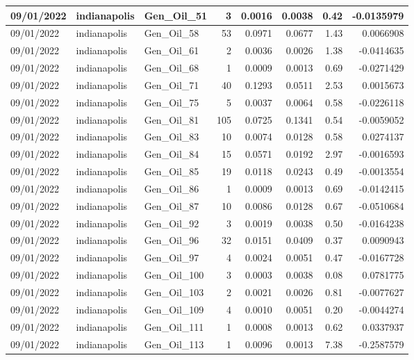 \documentclass[
  letterpaper,
  DIV=11,
  numbers=noendperiod]{scrartcl}
\begin{document}
\begin{tabular}{l|l|l|r|r|r|r|r}
\hline
09/01/2022 & indianapolis & Gen\_Oil\_51 & 3 & 0.0016 & 0.0038 & 0.42 & -0.0135979\\
\hline
09/01/2022 & indianapolis & Gen\_Oil\_58 & 53 & 0.0971 & 0.0677 & 1.43 & 0.0066908\\
\hline
09/01/2022 & indianapolis & Gen\_Oil\_61 & 2 & 0.0036 & 0.0026 & 1.38 & -0.0414635\\
\hline
09/01/2022 & indianapolis & Gen\_Oil\_68 & 1 & 0.0009 & 0.0013 & 0.69 & -0.0271429\\
\hline
09/01/2022 & indianapolis & Gen\_Oil\_71 & 40 & 0.1293 & 0.0511 & 2.53 & 0.0015673\\
\hline
09/01/2022 & indianapolis & Gen\_Oil\_75 & 5 & 0.0037 & 0.0064 & 0.58 & -0.0226118\\
\hline
09/01/2022 & indianapolis & Gen\_Oil\_81 & 105 & 0.0725 & 0.1341 & 0.54 & -0.0059052\\
\hline
09/01/2022 & indianapolis & Gen\_Oil\_83 & 10 & 0.0074 & 0.0128 & 0.58 & 0.0274137\\
\hline
09/01/2022 & indianapolis & Gen\_Oil\_84 & 15 & 0.0571 & 0.0192 & 2.97 & -0.0016593\\
\hline
09/01/2022 & indianapolis & Gen\_Oil\_85 & 19 & 0.0118 & 0.0243 & 0.49 & -0.0013554\\
\hline
09/01/2022 & indianapolis & Gen\_Oil\_86 & 1 & 0.0009 & 0.0013 & 0.69 & -0.0142415\\
\hline
09/01/2022 & indianapolis & Gen\_Oil\_87 & 10 & 0.0086 & 0.0128 & 0.67 & -0.0510684\\
\hline
09/01/2022 & indianapolis & Gen\_Oil\_92 & 3 & 0.0019 & 0.0038 & 0.50 & -0.0164238\\
\hline
09/01/2022 & indianapolis & Gen\_Oil\_96 & 32 & 0.0151 & 0.0409 & 0.37 & 0.0090943\\
\hline
09/01/2022 & indianapolis & Gen\_Oil\_97 & 4 & 0.0024 & 0.0051 & 0.47 & -0.0167728\\
\hline
09/01/2022 & indianapolis & Gen\_Oil\_100 & 3 & 0.0003 & 0.0038 & 0.08 & 0.0781775\\
\hline
09/01/2022 & indianapolis & Gen\_Oil\_103 & 2 & 0.0021 & 0.0026 & 0.81 & -0.0077627\\
\hline
09/01/2022 & indianapolis & Gen\_Oil\_109 & 4 & 0.0010 & 0.0051 & 0.20 & -0.0044274\\
\hline
09/01/2022 & indianapolis & Gen\_Oil\_111 & 1 & 0.0008 & 0.0013 & 0.62 & 0.0337937\\
\hline
09/01/2022 & indianapolis & Gen\_Oil\_113 & 1 & 0.0096 & 0.0013 & 7.38 & -0.2587579\\

\end{tabular}
\end{document}
